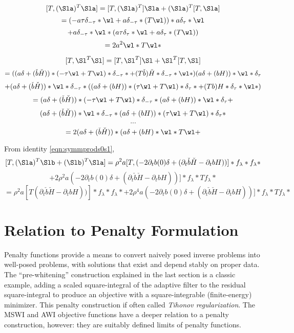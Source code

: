 \[
  [T,(\Sla)^T\Sla] = [T,(\Sla)^T]\Sla + (\Sla)^T [T,\Sla]
\]
\[
= (-a \tau \delta_{-\tau} * \wl + a \delta_{-\tau}*(T\wl)) *
a\delta_{\tau} * \wl
\]
\[
  + a \delta_{-\tau} * \wl *  ( a \tau \delta_{\tau} * \wl + a
  \delta_{\tau} * (T\wl))
\]
\[
  = 2 a^2 \wl * T\wl *
\]

\[
  [T,\Sl^T\Sl] = [T,\Sl^T]\Sl + \Sl^T [T,\Sl]
\]
\[
  =((a\delta + (\check{b}\check{H}))*(-\tau \wl +
  T\wl)*\delta_{-\tau}* + (T\check{b})\check{H}
  *\delta_{-\tau}*\wl*)(a \delta + (bH))*\wl*\delta_{\tau}
\]
\[
  +(a \delta + (\check{b}\check{H}))*\wl*\delta_{-\tau}*
  ((a\delta + (bH))*(\tau \wl +
  T\wl)*\delta_{\tau}* + (Tb)H *\delta_{\tau}*\wl*)
\]
\[
=(a\delta + (\check{b}\check{H}))*(-\tau \wl +
T\wl)*\delta_{-\tau}*(a \delta + (bH))*\wl*\delta_{\tau} +
\]
\[
  (a \delta + (\check{b}\check{H}))*\wl*\delta_{-\tau}*(a\delta + (bH))*(\tau \wl +
  T\wl)*\delta_{\tau}*
\]
\[
  ...
\]
\[
  = 2(a \delta + (\check{b}\check{H}))*(a\delta + (bH)*\wl*T\wl +
\]

From identity \ref{eqn:symmprods0s1},
\[
  [T,(\Sla)^T\Slb+(\Slb)^T\Sla] = \rho^2 a[T,(-2\partial_t b(0) \delta +
  (\partial_t\check{b}\check{H}-\partial_tb
  H))]*f_{\lambda}*f_{\lambda}*
\]
\[
  + 2\rho^2 a (-2\partial_t b(0) \delta +
  (\partial_t\check{b}\check{H}-\partial_tb
  H))]*f_{\lambda}*Tf_{\lambda}*
\]
\[
  =
  \rho^2 a[ T (\partial_t\check{b}\check{H}-\partial_tb
  H))]*f_{\lambda}*f_{\lambda}* +  2\rho^4 a (-2\partial_t b(0) \delta +
  (\partial_t\check{b}\check{H}-\partial_tb
  H))]*f_{\lambda}*Tf_{\lambda}*
\]





\section{Relation to Penalty Formulation}
Penalty functions provide a means to convert naively posed
inverse problems into well-posed problems, with solutions that exist
and depend stably on proper data. The ``pre-whitening'' construction
explained in the last section is a classic example, adding a scaled
square-integral of the adaptive filter to the residual square-integral to
produce an objective with a square-integrable (finite-energy)
minimizer. This penalty construction if often called {\em Tihonov
  regularization}. The MSWI and AWI objective functions have a deeper
relation to a penalty construction, however: they are
suitably defined limits of penalty functions.

